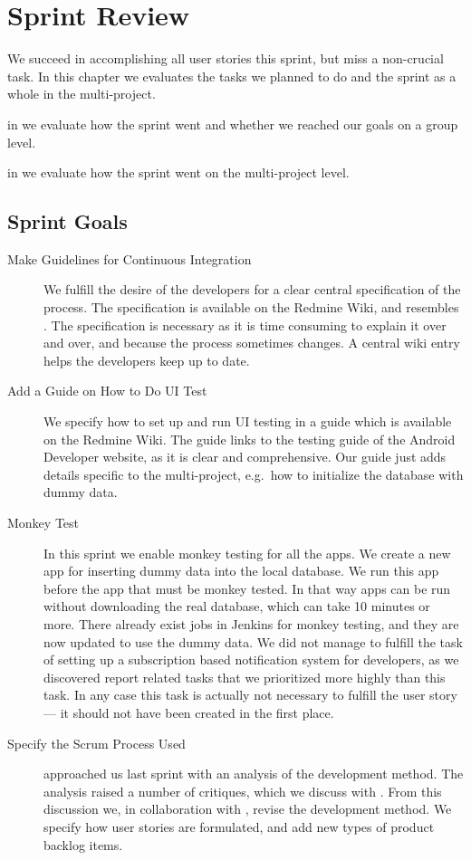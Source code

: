 \chapter{Sprint Review}\label{chap:sprint3_end}
We succeed in accomplishing all user stories this sprint, but miss a non-crucial task. In this chapter we evaluates the tasks we planned to do and the sprint as a whole in the multi-project.

\begin{chapterorganization}
  \item in  we evaluate how the sprint went and whether we reached our goals on a group level.
  \item in  we evaluate how the sprint went on the multi-project level.
\end{chapterorganization}

\section{Sprint Goals}\label{sec:s3_goals}
\begin{description}
  \item[Make Guidelines for Continuous Integration] We fulfill the desire of the developers for a clear central specification of the process. The specification is available on the Redmine Wiki, and resembles . The specification is necessary as it is time consuming to explain it over and over, and because the process sometimes changes. A central wiki entry helps the developers keep up to date.
  \item[Add a Guide on How to Do UI Test] We specify how to set up and run UI testing in a guide which is available on the Redmine Wiki. The guide links to the testing guide \parencite{AndroidUnit} of the Android Developer website, as it is clear and comprehensive. Our guide just adds details specific to the multi-project, e.g.\ how to initialize the database with dummy data.
  \item[Monkey Test] In this sprint we enable monkey testing for all the apps. We create a new app for inserting dummy data into the local database. We run this app before the app that must be monkey tested. In that way apps can be run without downloading the real database, which can take 10 minutes or more. There already exist jobs in Jenkins for monkey testing, and they are now updated to use the dummy data. We did not manage to fulfill the task of setting up a subscription based notification system for developers, as we discovered report related tasks that we prioritized more highly than this task. In any case this task is actually not necessary to fulfill the user story --- it should not have been created in the first place.
  \item[Specify the Scrum Process Used]  approached us last sprint with an analysis of the development method. The analysis raised a number of critiques, which we discuss with . From this discussion we, in collaboration with , revise the development method. We specify how user stories are formulated, and add new types of product backlog items.
\end{description}

